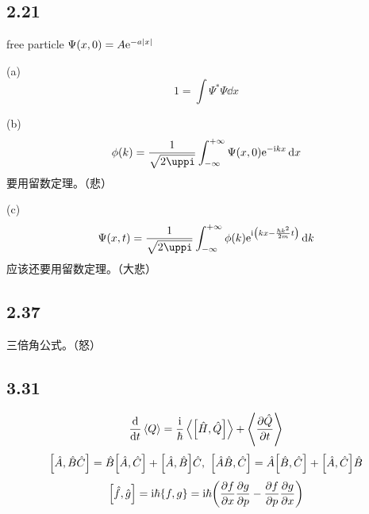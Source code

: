 \subsection{2.21}
\begin{framed}
    free particle $\Psi(x, 0) = A \mathrm{e}^{- a \qty|x|}$

    (a)
    \[
        1 = \int \Psi^* \Psi \dd{x}
    \]

    (b)
    \[
        \phi(k) = \frac{1}{\sqrt{2 \uppi}} \int^{+ \infty}_{- \infty} \Psi(x, 0) \rme^{- \rmi k x} \dd{x}
    \] 要用留数定理。（悲）

    (c)
    \[
        \Psi(x, t) = \frac{1}{\sqrt{2 \uppi}} \int^{+ \infty}_{- \infty} \phi(k) \rme^{\rmi \qty(k x - \frac{\hbar k^2}{2 m} t)} \dd{k}
    \] 应该还要用留数定理。（大悲）
\end{framed}

\subsection{2.37}

\begin{framed}
    三倍角公式。（怒）
\end{framed}

\subsection{3.31}
\begin{framed}
    \[
        \dv{t} \expval{Q} = \frac{\mathrm{i}}{\hbar} \expval{\qty[\hat{H}, \hat{Q}]} + \expval{\pdv{\hat{Q}}{t}}
    \] \[
        \qty[\hat{A}, \hat{B} \hat{C}] = \hat{B} \qty[\hat{A}, \hat{C}] + \qty[\hat{A}, \hat{B}] \hat{C},\ \qty[\hat{A} \hat{B}, \hat{C}] = \hat{A} \qty[\hat{B}, \hat{C}] + \qty[\hat{A}, \hat{C}] \hat{B}
    \] \[
        \qty[\hat{f}, \hat{g}] = \mathrm{i} \hbar \qty{f, g} = \mathrm{i} \hbar \qty(\pdv{f}{x} \pdv{g}{p} - \pdv{f}{p} \pdv{g}{x})
    \]
\end{framed}

